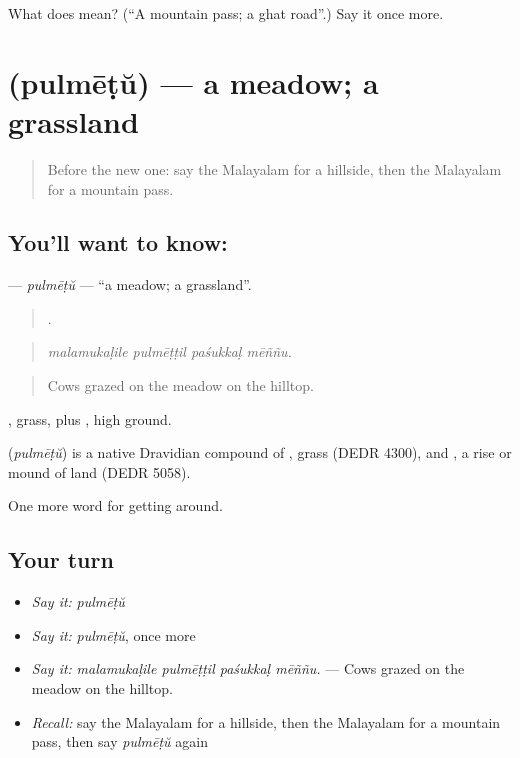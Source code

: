 \begin{tcolorbox}[breakable,colback=teal!4,colframe=teal!35!black,title={Before you move on}]
What does  mean? (\textquotedblleft{}A mountain pass; a ghat road\textquotedblright{}.) Say it once more.
\end{tcolorbox}
\section[\texorpdfstring{\ml{പുൽമേട്} (pulmēṭŭ)}{പുൽമേട് (pulmēṭŭ)}]{ (pulmēṭŭ) — a meadow; a grassland}

\label{lesson:ML-C495-pulmetu}



\begin{quote}
Before the new one: say the Malayalam for a hillside, then the Malayalam for a mountain pass.
\end{quote}

\subsection*{You'll want to know: }
\textbf{} — \emph{pulmēṭŭ} — \textquotedblleft{}a meadow; a grassland\textquotedblright{}.

\begin{quote}
   .
\end{quote}

\begin{quote}
\emph{malamukaḷile pulmēṭṭil paśukkaḷ mēññu.}
\end{quote}

\begin{quote}
Cows grazed on the meadow on the hilltop.
\end{quote}

, grass, plus , high ground.

\begin{cousinweb}
\textbf{} (\emph{pulmēṭŭ}) is a native Dravidian compound of , grass (DEDR 4300), and , a rise or mound of land (DEDR 5058).
\end{cousinweb}

\begin{grammarlens}[title={What you've built}]
One more word for getting around.
\end{grammarlens}

\subsection*{Your turn}
\begin{itemize}
\raggedright
  \item \emph{Say it:} \emph{pulmēṭŭ}
  \item \emph{Say it:} \emph{pulmēṭŭ}, once more
  \item \emph{Say it:} \emph{malamukaḷile pulmēṭṭil paśukkaḷ mēññu.} — Cows grazed on the meadow on the hilltop.
  \item \emph{Recall:} say the Malayalam for a hillside, then the Malayalam for a mountain pass, then say \emph{pulmēṭŭ} again
\end{itemize}

